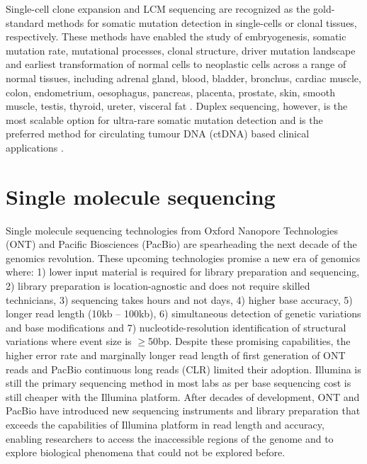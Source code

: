 Single-cell clone expansion and LCM sequencing are recognized as the gold-standard methods for somatic mutation detection in single-cells or clonal tissues, respectively. These methods have enabled the study of embryogenesis, somatic mutation rate, mutational processes, clonal structure, driver mutation landscape and earliest transformation of normal cells to neoplastic cells across a range of normal tissues, including adrenal gland, blood, bladder, bronchus, cardiac muscle, colon, endometrium, oesophagus, pancreas, placenta, prostate, skin, smooth muscle, testis, thyroid, ureter, visceral fat \cite{Lee-Six2018-qe, Martincorena2015-gu, Ju2017-vw, Martincorena2018-av, Brunner2019-xg, Lee-Six2019-vt, Yoshida2020-yr, Olafsson2020-vi, Moore2020-pi, Lawson2020-em, MSpencer_Chapman2021-cq, Coorens2021-ct, Robinson2021-te, Grossmann2021-gd, Moore2021-dl, Park2021-fx, Ng2021-jd}. Duplex sequencing, however, is the most scalable option for ultra-rare somatic mutation detection and is the preferred method for circulating tumour DNA (ctDNA) based clinical applications \cite{Newman2016-cy}.

\section{Single molecule sequencing}

Single molecule sequencing technologies from Oxford Nanopore Technologies (ONT) and Pacific Biosciences (PacBio) are spearheading the next decade of the genomics revolution. These upcoming technologies promise a new era of genomics where: 1) lower input material is required for library preparation and sequencing, 2) library preparation is location-agnostic and does not require skilled technicians, 3) sequencing takes hours and not days, 4) higher base accuracy, 5) longer read length (10kb – 100kb), 6) simultaneous detection of genetic variations and base modifications and 7) nucleotide-resolution identification of structural variations where event size is $\geq$50bp. Despite these promising capabilities, the higher error rate and marginally longer read length of first generation of ONT reads and PacBio continuous long reads (CLR) limited their adoption. Illumina is still the primary sequencing method in most labs as per base sequencing cost is still cheaper with the Illumina platform. After decades of development, ONT and PacBio have introduced new sequencing instruments and library preparation that exceeds the capabilities of Illumina platform in read length and accuracy, enabling researchers to access the inaccessible regions of the genome and to explore biological phenomena that could not be explored before.

